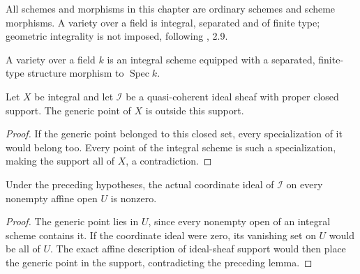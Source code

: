\begingroup

All schemes and morphisms in this chapter are ordinary schemes and scheme
morphisms. A variety over a field is integral, separated and of finite type;
geometric integrality is not imposed, following \cite{deJong1996}, 2.9.

\begin{definition}
\label{def:variety}
\leanok
A variety over a field $k$ is an integral scheme equipped with a separated,
finite-type structure morphism to $\operatorname{Spec}k$.
\end{definition}

\endgroup

\begingroup

\begin{lemma}
\label{lem:integral-ideal-generic-outside}
\leanok
Let $X$ be integral and let $\mathcal I$ be a quasi-coherent ideal sheaf
with proper closed support. The generic point of $X$ is outside this support.
\end{lemma}
\begin{proof}
If the generic point belonged to this closed set, every specialization
of it would belong too. Every point of the integral scheme is such a
specialization, making the support all of $X$, a contradiction.
\end{proof}

\endgroup

\begingroup

\begin{lemma}
\label{lem:integral-ideal-affine-nonzero}
\leanok
Under the preceding hypotheses, the actual coordinate ideal of
$\mathcal I$ on every nonempty affine open $U$ is nonzero.
\end{lemma}
\begin{proof}
The generic point lies in $U$, since every nonempty open of an integral
scheme contains it. If the coordinate ideal were zero, its vanishing
set on $U$ would be all of $U$. The exact affine description of ideal-sheaf
support would then place the generic point in the support, contradicting
the preceding lemma.
\end{proof}
\endgroup

